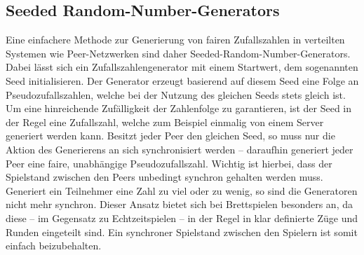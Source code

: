 \subsection{Seeded Random-Number-Generators}
Eine einfachere Methode zur Generierung von fairen Zufallszahlen in verteilten Systemen wie Peer-Netzwerken sind daher \glqq{}Seeded-Random-Number-Generators\grqq{}. Dabei lässt sich ein Zufallszahlengenerator mit einem Startwert, dem sogenannten \glqq{}Seed\grqq{} initialisieren. Der Generator erzeugt basierend auf diesem Seed eine Folge an Pseudozufallszahlen, welche bei der Nutzung des gleichen Seeds stets gleich ist. Um eine hinreichende Zufälligkeit der Zahlenfolge zu garantieren, ist der Seed in der Regel eine Zufallszahl, welche zum Beispiel einmalig von einem Server generiert werden kann. Besitzt jeder Peer den gleichen Seed, so muss nur die Aktion des Generierens an sich synchronisiert werden -- daraufhin generiert jeder Peer eine faire, unabhängige Pseudozufallszahl. Wichtig ist hierbei, dass der Spielstand zwischen den Peers unbedingt synchron gehalten werden muss. Generiert ein Teilnehmer eine Zahl zu viel oder zu wenig, so sind die Generatoren nicht mehr synchron. Dieser Ansatz bietet sich bei Brettspielen besonders an, da diese -- im Gegensatz zu Echtzeitspielen -- in der Regel in klar definierte \glqq{}Züge\grqq{} und \glqq{}Runden\grqq{} eingeteilt sind. Ein synchroner Spielstand zwischen den Spielern ist somit einfach beizubehalten.\par

